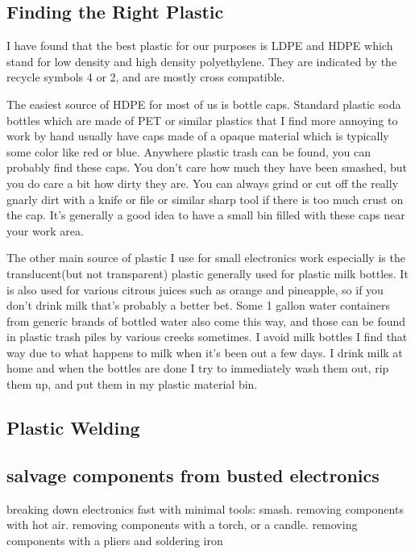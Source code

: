 \subsection{Finding the Right Plastic}\label{finding-the-right-plastic}

I have found that the best plastic for our purposes is LDPE and HDPE
which stand for low density and high density polyethylene. They are
indicated by the recycle symbols 4 or 2, and are mostly cross
compatible.

The easiest source of HDPE for most of us is bottle caps. Standard
plastic soda bottles which are made of PET or similar plastics that I
find more annoying to work by hand usually have caps made of a opaque
material which is typically some color like red or blue. Anywhere
plastic trash can be found, you can probably find these caps. You don't
care how much they have been smashed, but you do care a bit how dirty
they are. You can always grind or cut off the really gnarly dirt with a
knife or file or similar sharp tool if there is too much crust on the
cap. It's generally a good idea to have a small bin filled with these
caps near your work area.

The other main source of plastic I use for small electronics work
especially is the translucent(but not transparent) plastic generally
used for plastic milk bottles. It is also used for various citrous
juices such as orange and pineapple, so if you don't drink milk that's
probably a better bet. Some 1 gallon water containers from generic
brands of bottled water also come this way, and those can be found in
plastic trash piles by various creeks sometimes. I avoid milk bottles I
find that way due to what happens to milk when it's been out a few days.
I drink milk at home and when the bottles are done I try to immediately
wash them out, rip them up, and put them in my plastic material bin.

\subsection{Plastic Welding}\label{plastic-welding}

\subsection{salvage components from busted
electronics}\label{salvage-components-from-busted-electronics}

breaking down electronics fast with minimal tools: smash. removing
components with hot air. removing components with a torch, or a candle.
removing components with a pliers and soldering iron

